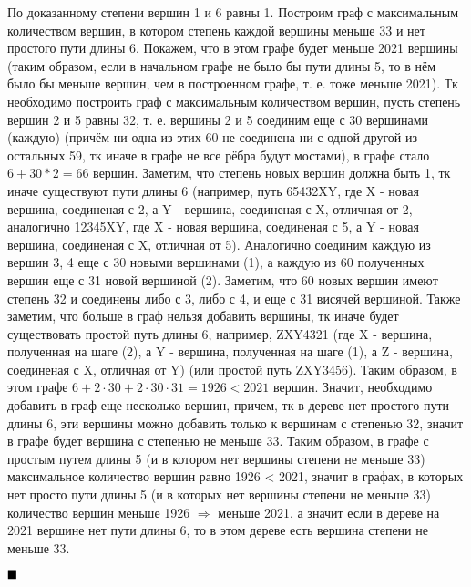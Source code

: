 \documentclass[a4paper, 16pt]{article}
\newenvironment{proof}[1][Доказательство]{%
	\begin{trivlist}
		\item[\hskip \labelsep {\bfseries #1:}]
		\item \hspace{14pt}
	}{
		$ \hfill\blacksquare $
	\end{trivlist}
	\hfill\break
}
\begin{document}
\begin{proof}
				По доказанному степени вершин 1 и 6 равны 1. Построим граф с максимальным количеством вершин, в котором степень каждой вершины меньше 33 и нет простого пути длины 6. Покажем, что в этом графе будет меньше 2021 вершины (таким образом, если в начальном графе не было бы пути длины 5, то в нём было бы меньше вершин, чем в построенном графе, т. е. тоже меньше 2021). 
				Тк необходимо построить граф с максимальным количеством вершин, пусть степень вершин 2 и 5 равны 32, т. е. вершины 2 и 5 соединим еще с 30 вершинами (каждую) (причём ни одна из этих 60 не соединена ни с одной другой из остальных 59, тк иначе в графе не все рёбра будут мостами), в графе стало $6 + 30*2 = 66$ вершин. Заметим, что степень новых вершин должна быть 1, тк иначе существуют пути длины 6 (например, путь 65432XY, где X - новая вершина, соединеная с 2, а Y - вершина, соединеная с X, отличная от 2, аналогично 12345XY, где X - новая вершина, соединеная с 5, а Y - новая вершина, соединеная с X, отличная от 5). Аналогично соединим каждую из вершин 3, 4 еще с 30 новыми вершинами (1), а каждую из 60 полученных вершин еще с 31 новой вершиной (2). Заметим, что 60 новых вершин имеют степень 32 и соединены либо с 3, либо с 4, и еще с 31 висячей вершиной. Также заметим, что больше в граф нельзя добавить вершины, тк иначе будет существовать простой путь длины 6, например, ZXY4321 (где X - вершина, полученная на шаге (2), а Y - вершина, полученная на шаге (1), а Z - вершина, соединеная с X, отличная от Y) (или простой путь ZXY3456). Таким образом, в этом графе $6 + 2\cdot30 + 2 \cdot 30 \cdot 31 = 1926 < 2021$ вершин. Значит,  необходимо добавить в граф еще несколько вершин, причем, тк в дереве нет простого пути длины 6, эти вершины можно добавить только к вершинам с степенью 32, значит в графе будет вершина с степенью не меньше 33. Таким образом, в графе с простым путем длины 5 (и в котором нет вершины степени не меньше 33) максимальное количество вершин равно 1926 < 2021, значит в графах, в которых нет просто пути длины 5 (и в которых нет вершины степени не меньше 33) количество вершин меньше 1926 $\Rightarrow$ меньше 2021, а значит если в дереве на 2021 вершине нет пути длины 6, то в этом дереве есть вершина степени не меньше 33.
				
			\end{proof}
			
\end{document}
